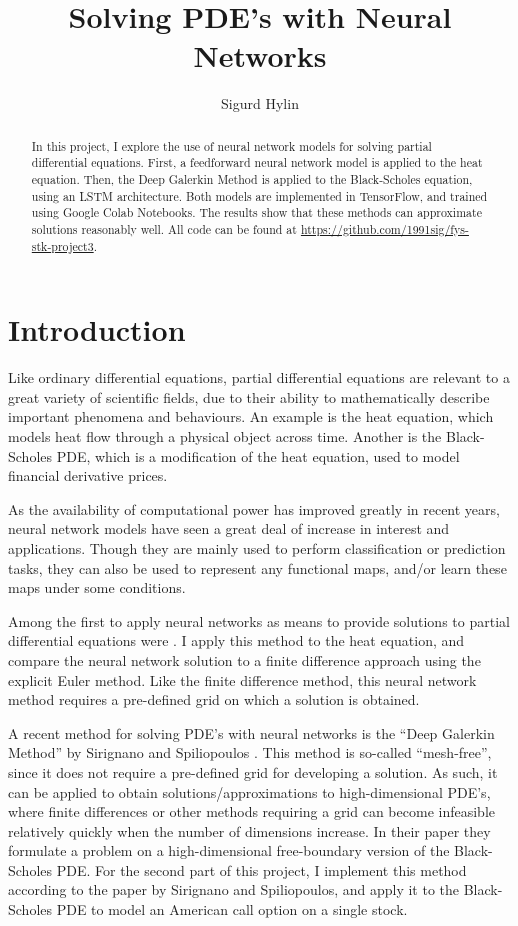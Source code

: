 \documentclass[]{article}
\title{Solving PDE's with Neural Networks}
\author{Sigurd Hylin}
\date{}
\begin{document}
\maketitle
\begin{abstract}
In this project, I explore the use of neural network models for solving
partial differential equations. First, a feedforward neural network
model is applied to the heat equation. Then, the Deep Galerkin Method is
applied to the Black-Scholes equation, using an LSTM architecture. Both
models are implemented in TensorFlow, and trained using Google Colab
Notebooks. The results show that these methods can approximate solutions
reasonably well. All code can be found at
\url{https://github.com/1991sig/fys-stk-project3}.
\end{abstract}

{
\setcounter{tocdepth}{2}
\tableofcontents
}
\section{Introduction}\label{introduction}

Like ordinary differential equations, partial differential equations are
relevant to a great variety of scientific fields, due to their ability
to mathematically describe important phenomena and behaviours. An
example is the heat equation, which models heat flow through a physical
object across time. Another is the Black-Scholes PDE, which is a
modification of the heat equation, used to model financial derivative
prices.

As the availability of computational power has improved greatly in
recent years, neural network models have seen a great deal of increase
in interest and applications. Though they are mainly used to perform
classification or prediction tasks, they can also be used to represent
any functional maps, and/or learn these maps under some
conditions.\citep{Goodfellow-et-al-2016}

Among the first to apply neural networks as means to provide solutions
to partial differential equations were \citet{Lagaris1998ArtificialNN}.
I apply this method to the heat equation, and compare the neural network
solution to a finite difference approach using the explicit Euler
method. Like the finite difference method, this neural network method
requires a pre-defined grid on which a solution is obtained.

A recent method for solving PDE's with neural networks is the ``Deep
Galerkin Method'' by Sirignano and Spiliopoulos \citep{Sirignano_2018}.
This method is so-called ``mesh-free'', since it does not require a
pre-defined grid for developing a solution. As such, it can be applied
to obtain solutions/approximations to high-dimensional PDE's, where
finite differences or other methods requiring a grid can become
infeasible relatively quickly when the number of dimensions increase. In
their paper they formulate a problem on a high-dimensional free-boundary
version of the Black-Scholes PDE. For the second part of this project, I
implement this method according to the paper by Sirignano and
Spiliopoulos, and apply it to the Black-Scholes PDE to model an American
call option on a single stock.
\end{document}
